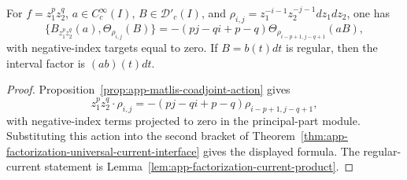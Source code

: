 \begin{cor}
\label{cor:app-factorization-principal-part-current-brackets}
\label{prop:app-factorization-principal-part-bracket}
  For \(f=z_1^p z_2^q\), \(a\in C^\infty_c(I)\),
  \(B\in\mathcal D'_c(I)\), and
  \(\rho_{i,j}=z_1^{-i-1}z_2^{-j-1}dz_1dz_2\), one has
  \[
    \{B_{z_1^p z_2^q}(a),\Theta_{\rho_{i,j}}(B)\}
      =
      -(pj-qi+p-q)
      \Theta_{\rho_{i-p+1,j-q+1}}(aB),
  \]
  with negative-index targets equal to zero.  If \(B=b(t)dt\) is
  regular, then the interval factor is \((ab)(t)dt\).
\end{cor}

\begin{proof}
  Proposition~\ref{prop:app-matlis-coadjoint-action} gives
  \[
    z_1^p z_2^q\cdot\rho_{i,j}
      =-(pj-qi+p-q)\rho_{i-p+1,j-q+1},
  \]
  with negative-index terms projected to zero in the principal-part
  module.  Substituting this action into the second bracket of
  Theorem~\ref{thm:app-factorization-universal-current-interface} gives
  the displayed formula.  The regular-current statement is
  Lemma~\ref{lem:app-factorization-current-product}.
\end{proof}

